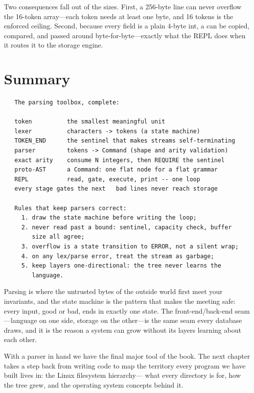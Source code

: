 Two consequences fall out of the sizes. First, a 256-byte line can
never overflow the 16-token array---each token needs at least one
byte, and 16 tokens is the enforced ceiling. Second, because every
field is a plain 4-byte int, a  can be copied, compared,
and passed around byte-for-byte---exactly what the REPL does when it
routes it to the storage engine.

\section{Summary}

\begin{verbatim}
   The parsing toolbox, complete:

   token          the smallest meaningful unit
   lexer          characters -> tokens (a state machine)
   TOKEN_END      the sentinel that makes streams self-terminating
   parser         tokens -> Command (shape and arity validation)
   exact arity    consume N integers, then REQUIRE the sentinel
   proto-AST      a Command: one flat node for a flat grammar
   REPL           read, gate, execute, print -- one loop
   every stage gates the next   bad lines never reach storage

   Rules that keep parsers correct:
     1. draw the state machine before writing the loop;
     2. never read past a bound: sentinel, capacity check, buffer
        size all agree;
     3. overflow is a state transition to ERROR, not a silent wrap;
     4. on any lex/parse error, treat the stream as garbage;
     5. keep layers one-directional: the tree never learns the
        language.
\end{verbatim}

\begin{osconcept}
Parsing is where the untrusted bytes of the outside world first meet
your invariants, and the state machine is the pattern that makes the
meeting safe: every input, good or bad, ends in exactly one state. The
front-end/back-end seam---language on one side, storage on the
other---is the same seam every database draws, and it is the reason a
system can grow without its layers learning about each other.
\end{osconcept}

With a parser in hand we have the final major tool of the book. The
next chapter takes a step back from writing code to map the territory
every program we have built lives in: the Linux filesystem hierarchy---
what every directory is for, how the tree grew, and the operating
system concepts behind it.

